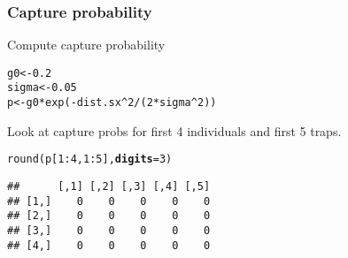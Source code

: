 \documentclass[color=usenames,dvipsnames]{beamer}\usepackage[]{graphicx}\usepackage[]{xcolor}
\makeatletter
\newcommand{\hlnum}[1]{\textcolor[rgb]{0.69,0.494,0}{#1}}%
\newcommand{\hlopt}[1]{\textcolor[rgb]{0,0,0}{#1}}%
\newcommand{\hldef}[1]{\textcolor[rgb]{0,0,0}{#1}}%
\newcommand{\hlkwb}[1]{\textcolor[rgb]{0,0.341,0.682}{#1}}%
\newcommand{\hlkwc}[1]{\textcolor[rgb]{0,0,0}{\textbf{#1}}}%
\newcommand{\hlkwd}[1]{\textcolor[rgb]{0.004,0.004,0.506}{#1}}%
\newenvironment{kframe}{%
 \def\at@end@of@kframe{}%
 \ifinner\ifhmode%
  \def\at@end@of@kframe{\end{minipage}}%
  \begin{minipage}{\columnwidth}%
 \fi\fi%
 \def\FrameCommand##1{\hskip\@totalleftmargin \hskip-\fboxsep
 \colorbox{shadecolor}{##1}\hskip-\fboxsep
     \hskip-\linewidth \hskip-\@totalleftmargin \hskip\columnwidth}%
 \MakeFramed {\advance\hsize-\width
   \@totalleftmargin\z@ \linewidth\hsize
   \@setminipage}}%
 {\par\unskip\endMakeFramed%
 \at@end@of@kframe}
\newenvironment{knitrout}{}{} %
\makeatother
\begin{document}
\begin{frame}[fragile]
  \frametitle{Capture probability}
  Compute capture probability
\begin{knitrout}\footnotesize
{}\color{fgcolor}\begin{kframe}
\begin{alltt}
\hldef{g0} \hlkwb{<-} \hlnum{0.2}
\hldef{sigma} \hlkwb{<-} \hlnum{0.05}
\hldef{p} \hlkwb{<-} \hldef{g0}\hlopt{*}\hlkwd{exp}\hldef{(}\hlopt{-}\hldef{dist.sx}\hlopt{^}\hlnum{2}\hlopt{/}\hldef{(}\hlnum{2}\hlopt{*}\hldef{sigma}\hlopt{^}\hlnum{2}\hldef{))}
\end{alltt}
\end{kframe}
\end{knitrout}
\pause
\vfill
  Look at capture probs for first 4 individuals and first 5 traps.
\begin{knitrout}\footnotesize
{}\color{fgcolor}\begin{kframe}
\begin{alltt}
\hlkwd{round}\hldef{(p[}\hlnum{1}\hlopt{:}\hlnum{4}\hldef{,}\hlnum{1}\hlopt{:}\hlnum{5}\hldef{],} \hlkwc{digits}\hldef{=}\hlnum{3}\hldef{)}
\end{alltt}
\begin{verbatim}
##      [,1] [,2] [,3] [,4] [,5]
## [1,]    0    0    0    0    0
## [2,]    0    0    0    0    0
## [3,]    0    0    0    0    0
## [4,]    0    0    0    0    0
\end{verbatim}
\end{kframe}
\end{knitrout}

\end{frame}
\end{document}
